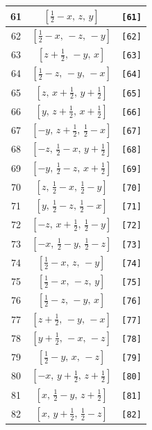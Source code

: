 \documentclass[fleqn,8pt]{jsarticle}
\begin{document}
\begin{longtable}{ccc}
61 & $\left[ \frac{1}{2} - x,\, z,\, y \right]$ & {\tt [61]} \\ \hline
62 & $\left[ \frac{1}{2} - x,\, - z,\, - y \right]$ & {\tt [62]} \\ \hline
63 & $\left[ z + \frac{1}{2},\, - y,\, x \right]$ & {\tt [63]} \\ \hline
64 & $\left[ \frac{1}{2} - z,\, - y,\, - x \right]$ & {\tt [64]} \\ \hline
65 & $\left[ z,\, x + \frac{1}{2},\, y + \frac{1}{2} \right]$ & {\tt [65]} \\ \hline
66 & $\left[ y,\, z + \frac{1}{2},\, x + \frac{1}{2} \right]$ & {\tt [66]} \\ \hline
67 & $\left[ - y,\, z + \frac{1}{2},\, \frac{1}{2} - x \right]$ & {\tt [67]} \\ \hline
68 & $\left[ - z,\, \frac{1}{2} - x,\, y + \frac{1}{2} \right]$ & {\tt [68]} \\ \hline
69 & $\left[ - y,\, \frac{1}{2} - z,\, x + \frac{1}{2} \right]$ & {\tt [69]} \\ \hline
70 & $\left[ z,\, \frac{1}{2} - x,\, \frac{1}{2} - y \right]$ & {\tt [70]} \\ \hline
71 & $\left[ y,\, \frac{1}{2} - z,\, \frac{1}{2} - x \right]$ & {\tt [71]} \\ \hline
72 & $\left[ - z,\, x + \frac{1}{2},\, \frac{1}{2} - y \right]$ & {\tt [72]} \\ \hline
73 & $\left[ - x,\, \frac{1}{2} - y,\, \frac{1}{2} - z \right]$ & {\tt [73]} \\ \hline
74 & $\left[ \frac{1}{2} - x,\, z,\, - y \right]$ & {\tt [74]} \\ \hline
75 & $\left[ \frac{1}{2} - x,\, - z,\, y \right]$ & {\tt [75]} \\ \hline
76 & $\left[ \frac{1}{2} - z,\, - y,\, x \right]$ & {\tt [76]} \\ \hline
77 & $\left[ z + \frac{1}{2},\, - y,\, - x \right]$ & {\tt [77]} \\ \hline
78 & $\left[ y + \frac{1}{2},\, - x,\, - z \right]$ & {\tt [78]} \\ \hline
79 & $\left[ \frac{1}{2} - y,\, x,\, - z \right]$ & {\tt [79]} \\ \hline
80 & $\left[ - x,\, y + \frac{1}{2},\, z + \frac{1}{2} \right]$ & {\tt [80]} \\ \hline
81 & $\left[ x,\, \frac{1}{2} - y,\, z + \frac{1}{2} \right]$ & {\tt [81]} \\ \hline
82 & $\left[ x,\, y + \frac{1}{2},\, \frac{1}{2} - z \right]$ & {\tt [82]} \\ \hline

\end{longtable}
\end{document}
